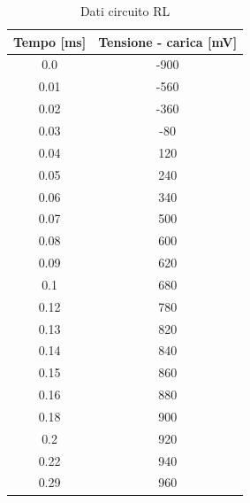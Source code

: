 \documentclass[letterpaper,12pt]{article}
\begin{document}
\begin{table}[htbp]
	\centering
	\caption{Dati circuito RL}
	\begin{tabular}{cc}
		\toprule
		Tempo [ms] & Tensione - carica [mV] \\
		\midrule
		0.0        & -900                   \\
		0.01       & -560                   \\
		0.02       & -360                   \\
		0.03       & -80                    \\
		0.04       & 120                    \\
		0.05       & 240                    \\
		0.06       & 340                    \\
		0.07       & 500                    \\
		0.08       & 600                    \\
		0.09       & 620                    \\
		0.1        & 680                    \\
		0.12       & 780                    \\
		0.13       & 820                    \\
		0.14       & 840                    \\
		0.15       & 860                    \\
		0.16       & 880                    \\
		0.18       & 900                    \\
		0.2        & 920                    \\
		0.22       & 940                    \\
		0.29       & 960                    \\
		\bottomrule
	\end{tabular}
	\label{tab:dati_RL}
\end{table}
\end{document}
